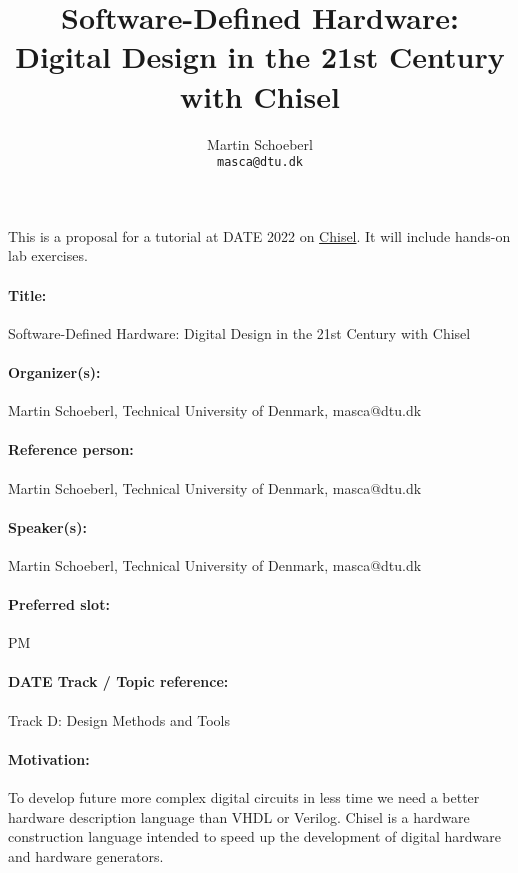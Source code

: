 \documentclass{article}
\begin{document}
\title{Software-Defined Hardware:\\ Digital Design in the 21st Century with Chisel}

\author{Martin Schoeberl\\
\texttt{masca@dtu.dk}}


\maketitle \thispagestyle{empty}

This is a proposal for a tutorial at DATE 2022 on \href{https://chisel.eecs.berkeley.edu/}{Chisel}.
It will include hands-on lab exercises.


\paragraph{Title:} Software-Defined Hardware: Digital Design in the 21st Century with Chisel
\paragraph{Organizer(s):} Martin Schoeberl, Technical University of Denmark, masca@dtu.dk
\paragraph{Reference person:} Martin Schoeberl, Technical University of Denmark, masca@dtu.dk
\paragraph{Speaker(s):} Martin Schoeberl, Technical University of Denmark, masca@dtu.dk
\paragraph{Preferred slot:} PM
\paragraph{DATE Track / Topic reference:} Track D: Design Methods and Tools

\paragraph{Motivation:}

To develop future more complex digital circuits in less time we need a better hardware description
language than VHDL or Verilog. Chisel is a hardware construction language intended to
speed up the development of digital hardware and hardware generators.
\end{document}

